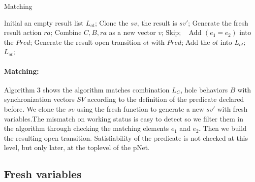 \documentclass{lncs/llncs}
\begin{document}
\begin{algorithm}
\caption{Matching}
\begin{algorithmic}[1]

\State Initial an empty result list $L_{ot}$;
		\State Clone the $sv$, the result is $sv'$;
		\State Generate the fresh result action $ra$;
		\State Combine $C, B, ra$ as a new vector $v$;
			\State Skip;
			\Else ~ Add $(e_1 = e_2)$ into the $Pred$;
			\EndIf
		\EndFor
		\State Generate the result open transition $ot$ with $Pred$;
		\State Add the $ot$ into $L_{ot}$;
	\EndFor
\EndFor 
\State \Return $L_{ot}$;

\end{algorithmic} 
\end{algorithm}

\paragraph{Matching:} Algorithm 3 shows the algorithm matches
combination $L_C$, hole behaviors $B$ with synchronization vectors
$SV$ according to the definition of the predicate declared before. We
clone the $sv$ using the fresh function to generate a new $sv'$ with
fresh variables.The mismatch on working status is easy to detect so we
filter them in the algorithm through checking the matching elements
$e_1$ and $e_2$. 
Then we build the resulting open transition. Satisfiability of the
predicate is not checked at this level, but only later, at the
toplevel of the pNet.

\subsection{Fresh variables}

\end{document}
